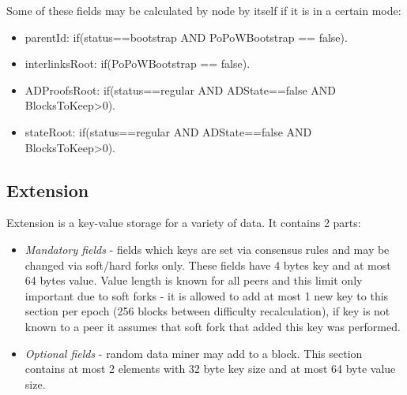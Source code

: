 \vspace{1em}
Some of these fields may be calculated by node by itself if it is in a certain mode:

\begin{itemize}
    \item parentId: if(status==bootstrap AND PoPoWBootstrap == false).
    \item interlinksRoot: if(PoPoWBootstrap == false).
    \item ADProofsRoot: if(status==regular AND ADState==false AND BlocksToKeep>0).
    \item stateRoot: if(status==regular AND ADState==false AND BlocksToKeep>0).
\end{itemize}

\subsection{Extension}

Extension is a key-value storage for a variety of data.
It contains 2 parts:
\begin{itemize}
    \item{\em Mandatory fields } - fields which keys are set via consensus rules and may be changed
    via soft/hard forks only. These fields have 4 bytes key and at most 64 bytes value.
    Value length is known for all peers and this limit only important due to soft forks -
    it is allowed to add at most 1 new key to this section per epoch (256 blocks between
    difficulty recalculation), if key is not known to a peer it assumes that soft fork that
    added this key was performed.
    \item{\em Optional fields } - random data miner may add to a block. This section contains at most 2
    elements with 32 byte key size and at most 64 byte value size.
\end{itemize}

